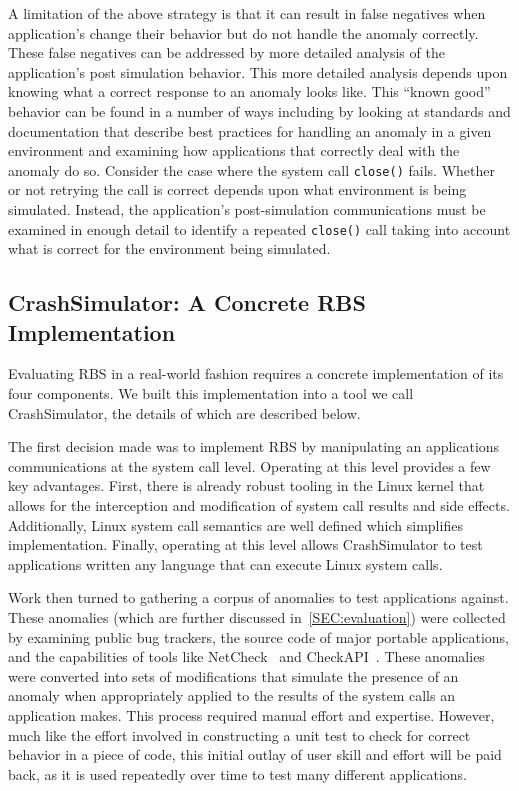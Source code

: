 A limitation of the above strategy
is that it can result in false negatives
when application's change their behavior
but do not handle the anomaly correctly.
These false negatives can be addressed
by more detailed analysis
of the application's post simulation behavior.
This more detailed analysis
depends upon knowing what a correct response
to an anomaly looks like.
This ``known good'' behavior can be found
in a number of ways
including by looking at standards and documentation
that describe best practices for handling an anomaly
in a given environment
and examining how applications that correctly
deal with the anomaly do so.
Consider the case where the system call {\tt close()} fails.
Whether or not retrying the call is correct
depends upon what environment is being simulated.
Instead, the application's post-simulation communications
must be examined in enough detail to identify a repeated {\tt close()}
call taking into account
what is correct for the environment being simulated.

\subsection{CrashSimulator: A Concrete RBS Implementation}

Evaluating RBS in a real-world fashion
requires a concrete implementation of its four components.
We built this implementation
into a tool we call CrashSimulator,
the details of which are described below.

The first decision made was to implement RBS by manipulating an
applications communications at the system call level.
Operating at this level provides a few key
advantages.  First, there is already robust tooling in the Linux kernel
that allows for the interception and modification of system call results
and side effects.  Additionally, Linux system call semantics are well
defined which simplifies implementation.  Finally, operating at this level
allows CrashSimulator to test applications written any language that can
execute Linux system calls.

Work then turned to gathering a corpus of anomalies to test applications
against.  These anomalies (which are further discussed
in~\ref{SEC:evaluation}) were collected by examining public bug trackers,
the source code of major portable applications, and the capabilities of
tools like NetCheck~\cite{Zhuang_NSDI_2014}
and CheckAPI~\cite{rasley2015detecting}.  These anomalies were converted
into sets of modifications that simulate the presence of an anomaly when
appropriately applied to the results of the system calls an application
makes.
This process required manual effort and expertise.  However,
much like
the effort involved in constructing a unit test to check for correct
behavior in a piece of code, this initial outlay of
user skill and effort will be paid back, as it is
used repeatedly over time to test many different applications.

